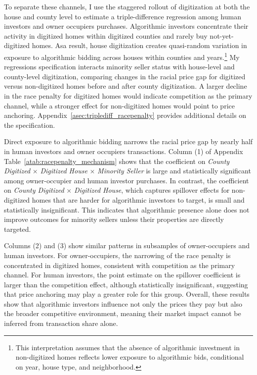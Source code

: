 \documentclass[11pt]{article}
\begin{document}
To separate these channels, I use the staggered rollout of digitization at both the house and county level to estimate a triple-difference regression among human investors and owner occupiers purchases. Algorithmic investors concentrate their activity in digitized homes within digitized counties and rarely buy not-yet-digitized homes. Asa result, house digitization creates quasi-random variation in exposure to algorithmic bidding across houses within counties and years.\footnote{This interpretation assumes that the absence of algorithmic investment in non-digitized homes reflects lower exposure to algorithmic bids, conditional on year, house type, and neighborhood.} My regressions specification interacts minority seller status with house-level and county-level digitization, comparing changes in the racial price gap for digitized versus non-digitized homes before and after county digitization. A larger decline in the race penalty for digitized homes would indicate competition as the primary channel, while a stronger effect for non-digitized homes would point to price anchoring. Appendix~\ref{asec:triplediff_racepenalty} provides additional details on the specification.


Direct exposure to algorithmic bidding narrows the racial price gap by nearly half in human investors and owner occupiers transactions. Column (1) of Appendix Table~\ref{atab:racepenalty_mechanism} shows that the coefficient on \textit{County Digitized} $\times$ \textit{Digitized House} $\times$ \textit{Minority Seller} is large and statistically significant among owner-occupier and human investor purchases. In contrast, the coefficient on \textit{County Digitized} $\times$ \textit{Digitized House}, which captures spillover effects for non-digitized homes that are harder for algorithmic investors to target, is small and statistically insignificant. This indicates that algorithmic presence alone does not improve outcomes for minority sellers unless their properties are directly targeted.

Columns (2) and (3) show similar patterns in subsamples of owner-occupiers and human investors. For owner-occupiers, the narrowing of the race penalty is concentrated in digitized homes, consistent with competition as the primary channel. For human investors, the point estimate on the spillover coefficient is larger than the competition effect, although statistically insignificant, suggesting that price anchoring may play a greater role for this group. Overall, these results show that algorithmic investors influence not only the prices they pay but also the broader competitive environment, meaning their market impact cannot be inferred from transaction share alone.
\end{document}
